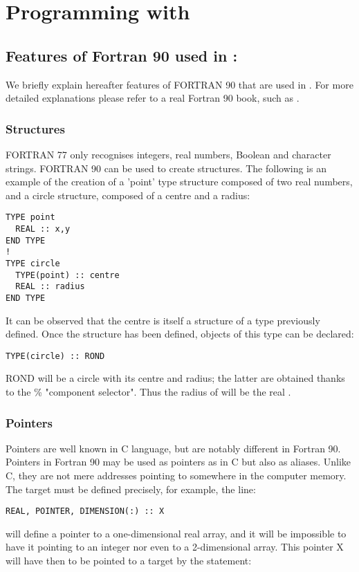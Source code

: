 \chapter{Programming with \bief}
\label{ref:programmingbief}
%
%
%
\section{Features of Fortran 90 used in \bief:}
%
We briefly explain hereafter features of FORTRAN 90 that are used in \bief. For
more detailed explanations please refer to a real Fortran 90 book, such as
\cite{Metcalf1990}.

\subsection{Structures}

FORTRAN 77 only recognises integers, real numbers, Boolean and character
strings. FORTRAN 90 can be used to create structures. The following is an
example of the creation of a 'point' type structure composed of two real
numbers, and a circle structure, composed of a centre and a radius:

\begin{lstlisting}[language=TelFortran]
TYPE point
  REAL :: x,y
END TYPE
!
TYPE circle
  TYPE(point) :: centre
  REAL :: radius
END TYPE
\end{lstlisting}

It can be observed that the centre is itself a structure of a type previously
defined. Once the structure has been defined, objects of this type can be
declared:
\begin{lstlisting}[language=TelFortran]
TYPE(circle) :: ROND
\end{lstlisting}
ROND will be a circle with its centre and radius; the latter are obtained
thanks to the \% "component selector". Thus the radius of  will be
the real .

\subsection{Pointers}

Pointers are well known in C language, but are notably different in Fortran 90.
Pointers in Fortran 90 may be used as pointers as in C but also as aliases.
Unlike C, they are not mere addresses pointing to somewhere in the computer
memory. The target must be defined precisely, for example, the line:

\begin{lstlisting}[language=TelFortran]
REAL, POINTER, DIMENSION(:) :: X
\end{lstlisting}
will define a pointer to a one-dimensional real array, and it will be
impossible to have it pointing to an integer nor even to a 2-dimensional array.
This pointer X will have then to be pointed to a target by the statement:


